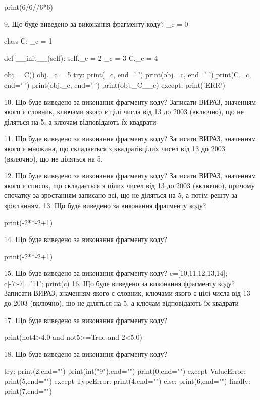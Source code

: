 \documentclass[11pt]{article}
\begin{document}
print(6/6//6*6)

9. Що буде виведено за виконання фрагменту коду?
_c = 0

class C:
    _c = 1
    
    def __init__(self):
        self._c = 2
        _c = 3
        C._c = 4

obj = C()
obj._c = 5
try:
    print(_c, end=' ')
    print(obj._c, end=' ')
    print(C._c, end=' ')
    print(obj._c, end=' ')
    print(obj._C__c)
except:
    print('ERR')

10. Що буде виведено за виконання фрагменту коду?
Записати ВИРАЗ, значенням якого є словник, ключами якого є цілі числа від 13 до 2003 (включно), що не діляться на 5, а ключам відповідають їх квадрати 

11. Що буде виведено за виконання фрагменту коду?
Записати ВИРАЗ, значенням якого є множина, що складається з квадратівцілих чисел від 13 до 2003 (включно), що не діляться на 5.

12. Що буде виведено за виконання фрагменту коду?
Записати ВИРАЗ, значенням якого є список, що складається з цілих чисел від 13 до 2003 (включно), причому спочатку за зростанням записано всі, що не діляться на 5, а потім решту за зростанням.
13. Що буде виведено за виконання фрагменту коду?

print(-2**-2+1)

14. Що буде виведено за виконання фрагменту коду?

print(-2**-2+1)

15. Що буде виведено за виконання фрагменту коду?
c=[10,11,12,13,14]; c[-7:-7]='11'; print(c)
16. Що буде виведено за виконання фрагменту коду?
Записати ВИРАЗ, значенням якого є словник, ключами якого є цілі числа від 13 до 2003 (включно), що не діляться на 5, а ключам відповідають їх квадрати 

17. Що буде виведено за виконання фрагменту коду?

print(not4>4.0 and not5>=True and 2<5.0)

18. Що буде виведено за виконання фрагменту коду?

try:
    print(2,end="")
    print(int("9"),end="")
    print(0,end="")
except ValueError: print(5,end="")
except TypeError: print(4,end="")
else: print(6,end="")
finally: print(7,end="")
\end{document}
